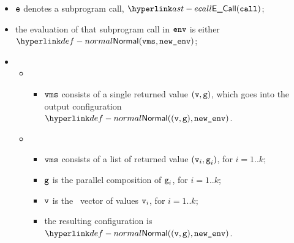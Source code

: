 \ProseParagraph
\AllApply
\begin{itemize}
  \item $\ve$ denotes a subprogram call, $\ECall(\vcall)$;
  \item the evaluation of that subprogram call in $\env$ is either
  $\Normal(\vms, \newenv)$\ProseOrAbnormal;
  \item \OneApplies
  \begin{itemize}
    \item {}
    \begin{itemize}
      \item $\vms$ consists of a single returned value $(\vv,\vg)$,
      which goes into the output configuration $\Normal((\vv, \vg), \newenv)$.
    \end{itemize}

    \item {}
    \begin{itemize}
      \item $\vms$ consists of a list of returned value $(\vv_i,\vg_i)$, for $i=1..k$;
      \item $\vg$ is the parallel composition of $\vg_i$, for $i=1..k$;
      \item $\vv$ is the \nativevalue\  vector of values $\vv_i$, for $i=1..k$;
      \item the resulting configuration is $\Normal((\vv, \vg), \newenv)$.
    \end{itemize}
  \end{itemize}
\end{itemize}

\FormallyParagraph
\begin{mathpar}
\end{mathpar}

\begin{mathpar}
\end{mathpar}

